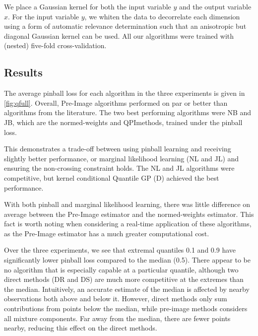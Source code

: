 \documentclass[twoside]{article} \usepackage{aistats2017}
\theoremstyle{definition}
\theoremstyle{theorem}
\newcommand{\qpi}{QPI}
\begin{document}
	We place a Gaussian kernel for both the input variable $y$ and the output variable $x$. For the input variable $y$, we whiten the data to decorrelate each dimension using a form of automatic relevance determination \citep{rasmussen2006gaussian} such that an anisotropic but diagonal Gaussian kernel can be used. All our algorithms were trained with (nested) five-fold cross-validation.
%
%
	\subsection{Results}
	\label{sec:experiments:results}
		
%
		
		The average pinball loss for each algorithm in the three experiments is given in \cref{fig:qfull}. Overall, Pre-Image algorithms performed on par or better than algorithms from the literature. The two best performing algorithms were NB and JB, which are the normed-weights and \qpi\space methods, trained under the pinball loss. %

		This demonstrates a trade-off between using pinball learning and receiving slightly better performance, or marginal likelihood learning (NL and JL) and ensuring the non-crossing constraint holds. The NL and JL algorithms were competitive, but kernel conditional Quantile GP (D) achieved the best performance.

		With both pinball and marginal likelihood learning, there was little difference on average between the Pre-Image estimator and the normed-weights estimator. This fact is worth noting when considering a real-time application of these algorithms, as the Pre-Image estimator has a much greater computational cost.
		
		Over the three experiments, we see that extremal quantiles 0.1 and 0.9 have significantly lower pinball loss compared to the median (0.5). There appear to be no algorithm that is especially capable at a particular quantile, although two direct methods (DR and DS) are much more competitive at the extremes than the median. Intuitively, an accurate estimate of the median is affected by nearby observations both above and below it. However, direct methods only sum contributions from points below the median, while pre-image methods considers all mixture components. Far away from the median, there are fewer points nearby, reducing this effect on the direct methods.
		
\end{document}
